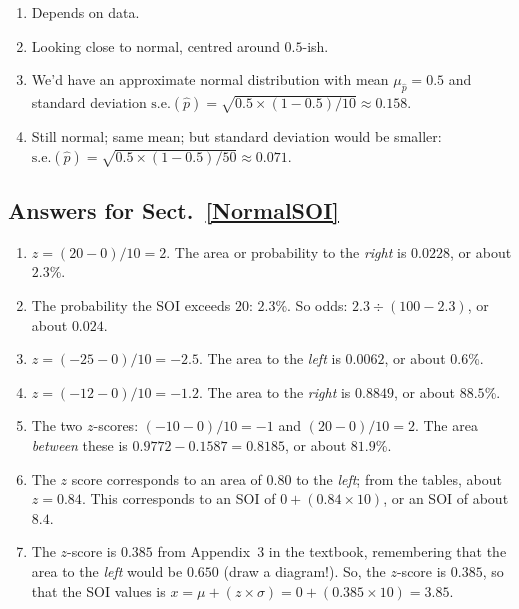 \documentclass[
  11pt,
  a4paper,
  krantz2]{krantz}
\providecommand{\tightlist}{%
  \setlength{\itemsep}{0pt}\setlength{\parskip}{0pt}}
\begin{document}
\begin{footnotesize}
\begin{enumerate}
\def\labelenumi{\arabic{enumi}.}
\tightlist
\item
  Depends on data.
\item
  Looking close to normal, centred around \(0.5\)-ish.
\item
  We'd have an approximate normal distribution with mean \(\mu_{\hat{p}} = 0.5\) and standard deviation \(\text{s.e.}(\hat{p}) = \sqrt{0.5 \times (1 - 0.5)/10} \approx 0.158\).
\item
  Still normal; same mean; but standard deviation would be smaller: \(\text{s.e.}(\hat{p}) = \sqrt{0.5 \times (1 - 0.5)/50} \approx 0.071\).
\end{enumerate}

\subsection*{Answers for Sect.~\ref{NormalSOI}}\label{answers-for-sect.-refnormalsoi}

\begin{enumerate}
\def\labelenumi{\arabic{enumi}.}
\setcounter{enumi}{1}
\tightlist
\item
  \(z = (20 - 0)/10 = 2\).
  The area or probability to the \emph{right} is \(0.0228\), or about \(2.3\)\%.
\item
  The probability the SOI exceeds \(20\): \(2.3\)\%.
  So odds: \(2.3\div(100 - 2.3)\), or about \(0.024\).
\item
  \(z = (-25 - 0)/10 = -2.5\).
  The area to the \emph{left} is \(0.0062\), or about \(0.6\)\%.
\item
  \(z = (-12 - 0)/10 = -1.2\).
  The area to the \emph{right} is \(0.8849\), or about \(88.5\)\%.
\item
  The two \(z\)-scores: \((-10 - 0)/10 = -1\) and \((20 - 0)/10 = 2\).
  The area \emph{between} these is \(0.9772 - 0.1587 = 0.8185\), or about \(81.9\)\%.
\item
  The \(z\) score corresponds to an area of \(0.80\) to the \emph{left}; from the tables, about \(z = 0.84\).
  This corresponds to an SOI of \(0 + (0.84\times 10)\), or an SOI of about \(8.4\).
\item
  The \(z\)-score is \(0.385\) from Appendix~3 in the textbook, remembering that the area to the \emph{left} would be \(0.650\) (draw a diagram!).
  So, the \(z\)-score is \(0.385\), so that the SOI values is \(x = \mu + (z\times\sigma) = 0 + (0.385\times 10) = 3.85\).
\end{enumerate}


\end{footnotesize}
\end{document}
